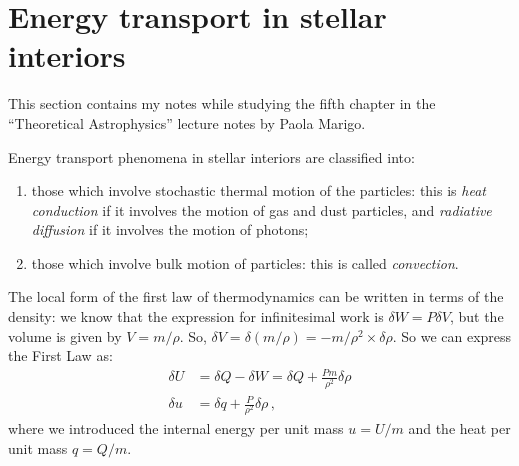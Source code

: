 \documentclass[main.tex]{subfiles}
\begin{document}
\section{Energy transport in stellar interiors}

This section contains my notes while studying the fifth chapter in the  ``Theoretical Astrophysics'' lecture notes by Paola Marigo. 

Energy transport phenomena in stellar interiors are classified into: 
\begin{enumerate}
  \item those which involve stochastic thermal motion of the particles: this is \emph{heat conduction} if it involves the motion of gas and dust particles, and \emph{radiative diffusion} if it involves the motion of photons;
  \item those which involve bulk motion of particles: this is called \emph{convection}. 
\end{enumerate}

The local form of the first law of thermodynamics can be written in terms of the density: we know that the expression for infinitesimal work is \(\delta W = P \delta V\), but the volume is given by \(V = m / \rho \). So, \(\delta V = \delta (m/\rho ) = - m / \rho^2 \times \delta \rho \). So we can express the First Law as:
%
\begin{align}
\delta U &= \delta Q - \delta W = \delta Q + \frac{Pm}{\rho^2} \delta \rho   \\
\delta u &= \delta q + \frac{P}{\rho^2} \delta \rho 
\,,
\end{align}
%
where we introduced the internal energy per unit mass \(u = U/m\) and the heat per unit mass \(q = Q/m\). 
\end{document}
